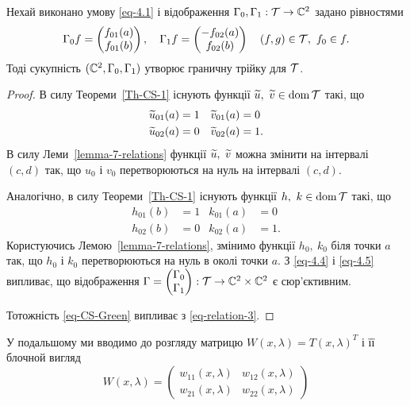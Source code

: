 \begin{theorem}\label{th-4.1}
	Нехай виконано умову \eqref{eq-4.1} і відображення $\Gamma_0, \Gamma_1:\mathcal{T}\to\mathbb{C}^2$ задано рівностями
	\begin{equation} \label{eq-4.3}
		\Gamma_0f = 
		\begin{pmatrix}
			f_{01}(a) \\ f_{01}(b)
		\end{pmatrix},\quad
		\Gamma_1f = 
		\begin{pmatrix}
			-f_{02}(a) \\ f_{02}(b)
		\end{pmatrix}\quad
		(f,g)\in\mathcal{T},\ f_0\in f.
	\end{equation}
	Тоді сукупність $(\mathbb{C}^2,\Gamma_0,\Gamma_1)$ утворює граничну трійку для $\mathcal{T}$.
\end{theorem}
\begin{proof}
	В силу Теореми~\ref{Th-CS-1} існують функції $\widetilde{u},\ \widetilde{v} \in\operatorname{dom}{\mathcal{T}}$ такі, що 
	\begin{align}\label{eq-4.4}
	 	\widetilde{u}_{01}(a)&=1 & \widetilde{v}_{01}(a)&=0 \\
	 	\widetilde{u}_{02}(a)&=0 & \widetilde{v}_{02}(a)&=1.
	 \end{align}
	В силу Леми~\ref{lemma-7-relations} функції $\widetilde{u},\ \widetilde{v}$ можна змінити на інтервалі $(c,d)$ так, що $u_0$ і $v_0$ перетворюються на нуль на інтервалі $(c,d)$.

	Аналогічно, в силу Теореми~\ref{Th-CS-1} існують функції $h,\ k \in\operatorname{dom}{\mathcal{T}}$ такі, що
	\begin{align}\label{eq-4.5}
	 	h_{01}(b)&=1 & k_{01}(a)&=0 \\
	 	h_{02}(b)&=0 & k_{02}(a)&=1.
	 \end{align}
	Користуючись Лемою~\ref{lemma-7-relations}, змінимо функції $h_0,\ k_0$ біля точки $a$ так, що $h_0$ і $k_0$ перетворюються на нуль в околі точки $a$. З \eqref{eq-4.4} і \eqref{eq-4.5} випливає, що відображення
	$
		\Gamma= 
		\begin{pmatrix}
			\Gamma_0 \\ \Gamma_1
		\end{pmatrix}
		:\mathcal{T}\to\mathbb{C}^2\times\mathbb{C}^2
	$
	є сюр'єктивним.

	Тотожність \eqref{eq-CS-Green} випливає з \eqref{eq-relation-3}.
\end{proof}

У подальшому ми вводимо до розгляду матрицю $W(x,\lambda) = T(x,\lambda)^{T}$ і її блочной вигляд
\begin{equation}
 	W(x,\lambda)= 
 	\begin{pmatrix}
 		w_{11}(x,\lambda) & w_{12}(x,\lambda)\\
 		w_{21}(x,\lambda) & w_{22}(x,\lambda)
 	\end{pmatrix}
 \end{equation} 

